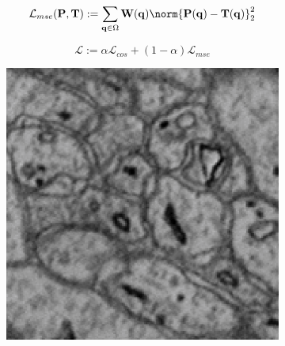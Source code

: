 \begin{equation} \label{mse}
\mathcal{L}_{mse}(\mathbf{P}, \mathbf{T}) := \sum_{\mathbf{q} \in \Omega} \mathbf{W}(\mathbf{q}) \norm{\mathbf{P}(\mathbf{q}) - \mathbf{T}(\mathbf{q})}_2^2
\end{equation}

\begin{equation} \label{loss}
\mathcal{L} := \alpha\mathcal{L}_{cos} + (1-\alpha)\mathcal{L}_{mse}
\end{equation}

\begin{figure}[htpb]
	\newcommand{\mywidth}{0.3\textwidth}
	\centering
	\begin{subfigure}[b]{\mywidth}
		\centering
		\includegraphics[width=\textwidth]{data/images/fieldLearning/fi_image.png}
		\caption{\label{fig:fi_im}}
	\end{subfigure}
	\hspace{3mm}
	\begin{subfigure}[b]{\mywidth}
		\centering

\end{subfigure}
\end{figure}
